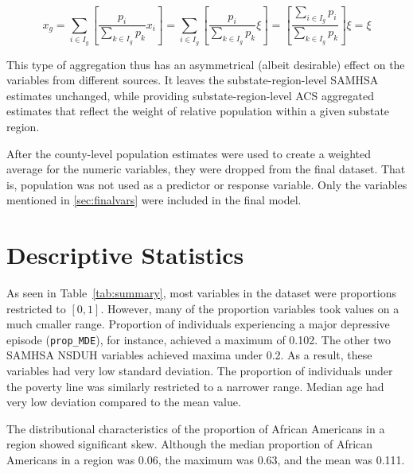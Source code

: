 \documentclass{article}
\begin{document}
\begin{equation*}
    x_g =
    \sum_{i \in I_g}
    \left[ \frac{p_{i}}{\sum_{k \in I_g} p_{k}} x_i \right] =
    \sum_{i \in I_g}
    \left[ \frac{p_{i}}{\sum_{k \in I_g} p_{k}} \xi \right] =
    \left[ \frac{\sum_{i \in I_g}p_{i}}{\sum_{k \in I_g} p_{k}} \right] \xi =
    \xi
\end{equation*}

This type of aggregation thus has an asymmetrical (albeit desirable)
effect on the variables from different sources.
It leaves the substate-region-level SAMHSA estimates unchanged,
while providing substate-region-level ACS aggregated estimates
that reflect the weight of relative population within a given substate region.

After the county-level population estimates were used
to create a weighted average for the numeric variables,
they were dropped from the final dataset.
That is, population was not used as a predictor or response variable.
Only the variables mentioned in \ref{sec:finalvars}
were included in the final model.

\section{Descriptive Statistics}

As seen in Table~\ref{tab:summary},
most variables in the dataset were proportions restricted to $[0, 1]$.
However, many of the proportion variables took values on a much cmaller range.
Proportion of individuals experiencing a major depressive episode
(\texttt{prop\_MDE}),
for instance, achieved a maximum of 0.102.
The other two SAMHSA NSDUH variables achieved maxima under 0.2.
As a result, these variables had very low standard deviation.
The proportion of individuals under the poverty line was similarly
restricted to a narrower range.
Median age had very low deviation compared to the mean value.

The distributional characteristics of the proportion of African Americans
in a region showed significant skew.
Although the median proportion of African Americans in a region was 0.06,
the maximum was 0.63, and the mean was 0.111.
\end{document}
